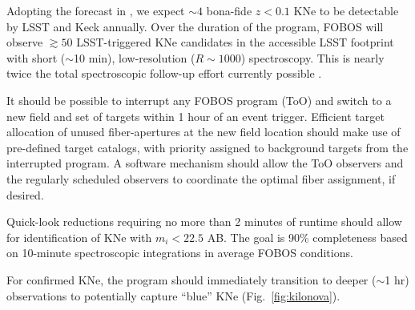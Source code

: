 \documentclass[11pt,a4paper,twoside,onecolumn,openany,final,oldfontcommands]{memoir}
\begin{document}
\begin{programrequirement}
\reqitem Adopting the forecast in \citet{margutti2018}, we expect $\sim4$ bona-fide $z < 0.1$ KNe to be detectable by LSST and Keck annually. Over the duration of the program, FOBOS will observe $\gtrsim50$ LSST-triggered KNe candidates in the accessible LSST footprint with short ($\sim$10 min), low-resolution ($R\sim1000$) spectroscopy.  This is nearly twice the total spectroscopic follow-up effort currently possible \citep{hosseinzadeh2019}.

\reqitem It should be possible to interrupt any FOBOS program (ToO) and switch to a new field and set of targets within 1 hour of an event trigger.  Efficient target allocation of unused fiber-apertures at the new field location should make use of pre-defined target catalogs, with priority assigned to background targets from the interrupted program.  A software mechanism should allow the ToO observers and the regularly scheduled observers to coordinate the optimal fiber assignment, if desired.


\reqitem Quick-look reductions requiring no more than 2 minutes of runtime should allow for identification of KNe with $m_i < 22.5$ AB.  The goal is 90\% completeness based on 10-minute spectroscopic integrations in average FOBOS conditions. 

\reqitem For confirmed KNe, the program should immediately transition to deeper ($\sim$1 hr) observations to potentially capture ``blue'' KNe (Fig.~\ref{fig:kilonova}).
\end{programrequirement}

\end{document}
